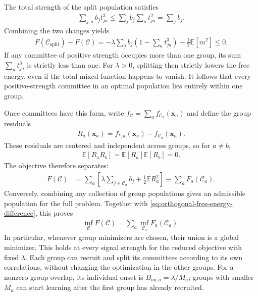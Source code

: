 \documentclass[11pt, reqno]{amsart}
\theoremstyle{notestyle}
\theoremstyle{defstyle}
\begin{document}
The total strength of the split population satisfies
\begin{align*}
    \sum_{j,a}b_jt_{ja}^3
    \leq\sum_j b_j\sum_a t_{ja}^2
    =\sum_j b_j.
\end{align*}
Combining the two changes yields
\begin{align}\label{eq:orthogonal-free-energy-difference}
    \boxed{
    F(\mathcal C_{\mathrm{split}})-F(\mathcal C)
    =-\lambda\sum_j b_j\left(1-\sum_a t_{ja}^3\right)
      -\frac12\mathbb E[m^2]\leq0.}
\end{align}
If any committee of positive strength occupies more than one group, its sum $\sum_a t_{ja}^3$ is strictly less than one.
For $\lambda>0$, splitting then strictly lowers the free energy, even if the total mixed function happens to vanish.
It follows that every positive-strength committee in an optimal population lies entirely within one group.

Once committees have this form, write $f_{\mathcal C}=\sum_a f_{\mathcal C_a}(\mathbf x_a)$ and define the group residuals
\begin{align*}
    R_a(\mathbf x_a)=f_{*,a}(\mathbf x_a)-f_{\mathcal C_a}(\mathbf x_a).
\end{align*}
These residuals are centered and independent across groups, so for $a\ne b$,
\begin{align*}
    \mathbb E[R_aR_b]=\mathbb E[R_a]\mathbb E[R_b]=0.
\end{align*}
The objective therefore separates:
\begin{align*}
    F(\mathcal C)
    &=\sum_a\left[
       \lambda\sum_{j\in\mathcal C_a}b_j
       +\frac12\mathbb E R_a^2\right]
      \equiv\sum_a F_a(\mathcal C_a).
\end{align*}
Conversely, combining any collection of group populations gives an admissible population for the full problem.
Together with \eqref{eq:orthogonal-free-energy-difference}, this proves
\begin{align}\label{eq:orthogonal-population-minimum}
    \boxed{\inf_{\mathcal C}F(\mathcal C)
    =\sum_a\inf_{\mathcal C_a}F_a(\mathcal C_a).}
\end{align}
In particular, whenever group minimizers are chosen, their union is a global minimizer.
This holds at every signal strength for the reduced objective with fixed $\lambda$.
Each group can recruit and split its committees according to its own correlations, without changing the optimization in the other groups.
For a nonzero group overlap, its individual onset is $B_{\mathrm{on},a}=\lambda/M_a$; groups with smaller $M_a$ can start learning after the first group has already recruited.
\end{document}

